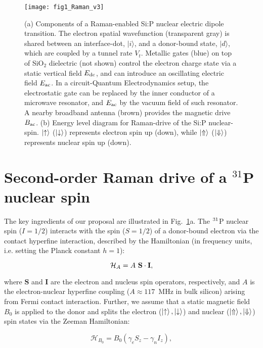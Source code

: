 \documentclass[
 aps,prb,twocolumn,
 amsmath,amssymb,superscriptaddress,
] {revtex4-1}
\begin{document}
\begin{figure}
\centering
\texttt{[image: fig1\_Raman\_v3]}
\caption{
		(a) Components of a Raman-enabled Si:P nuclear electric dipole transition. The electron  spatial wavefunction (transparent gray) is shared between an interface-dot, $|i\rangle$, and a donor-bound state, $|d\rangle$, which are coupled by a tunnel rate $V_t$. Metallic gates  (blue) on top of SiO$_2$ dielectric (not shown) control the electron charge state via a static vertical field $E_{\rm dc}$, and can introduce an oscillating electric field $E_{\rm ac}$. In a circuit-Quantum Electrodynamics setup, the electrostatic gate can be replaced by the inner conductor of a microwave resonator, and $E_{\rm ac}$ by the vacuum field of such resonator. A nearby broadband antenna \cite{Dehollain2013} (brown) provides the magnetic drive $B_{\rm ac}$. (b) Energy level diagram for Raman-drive of the Si:P nuclear-spin. $\ket{\uparrow}$ ($\ket{\downarrow}$) represents electron spin up (down), while $\ket{\Uparrow}$ ($\ket{\Downarrow}$) represents nuclear spin up (down).
}
\label{fig:Raman}
\end{figure}


\section{Second-order Raman drive of a $^{31}$P nuclear spin} \label{sec:Raman}

The key ingredients of our proposal are illustrated in Fig.~\ref{fig:Raman}a. The $^{\rm 31}$P nuclear spin ($I=1/2$) interacts with the spin ($S=1/2$) of a donor-bound electron via the contact hyperfine interaction, described by the Hamiltonian (in frequency units, i.e. setting the Planck constant $h=1$):

\begin{equation}
\mathcal{H}_A=A\ {\bf S\cdot I},
\end{equation}

where $\textbf{S}$ and $\textbf{I}$ are the electron and nucleus spin operators, respectively, and $A$ is the electron-nuclear hyperfine coupling ($A\approx117$~MHz in bulk silicon) arising from Fermi contact interaction. Further, we assume that a static magnetic field $B_0$ is applied to the donor and splits the electron ($\ket{\uparrow}, \ket{\downarrow}$) and nuclear ($\ket{\Uparrow}, \ket{\Downarrow}$) spin states via the Zeeman Hamiltonian:

\begin{equation}
\mathcal{H}_{B_0}=B_0\left(\gamma_eS_z-\gamma_nI_z\right),
\end{equation}
\end{document}
